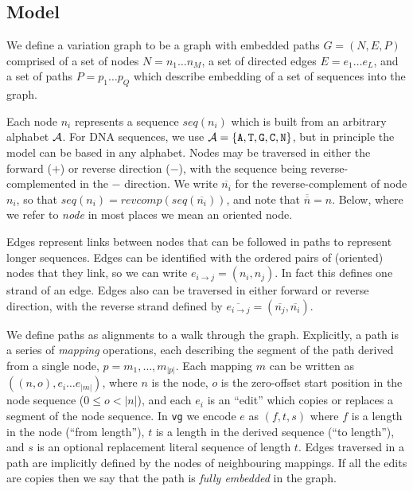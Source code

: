 \documentclass[12pt]{article}
\begin{document}
\subsection{Model}

We define a variation graph to be a graph with embedded paths $G = ( N, E, P )$ comprised of
a set of nodes $N = n_1 \ldots n_M$,
a set of directed edges $E = e_1 \ldots e_L$,
and a set of paths $P = p_1 \ldots p_Q$ which describe embedding of a set of sequences into the graph.

Each node $n_i$ represents a sequence $seq(n_i)$ which is built from an arbitrary alphabet ${ \cal A }$.
For DNA sequences, we use ${ \cal A } = \{ {\tt A, T, G, C, N} \}$, but in principle the model can be based in any alphabet.
Nodes may be traversed in either the forward ($+$) or reverse direction ($-$), with the sequence being reverse-complemented in the
$-$ direction.  
We write $\overline{n_i}$ for the reverse-complement of node $n_i$, so that $seq(n_i) = revcomp(seq(\overline{n_i}))$, and note
that $\overline{\overline{n}} = n$.  Below, where we refer to {\em node} in most places we mean an oriented node. 

Edges represent links between nodes that can be followed in paths to represent longer sequences.
Edges can be identified with the ordered pairs of (oriented) nodes that they link, so we can write
$e_{i \rightarrow j} = ( n_i, n_j ) $.  In fact this defines one strand of an edge.  Edges also can be traversed in either forward or
reverse direction, with the reverse strand defined by $\overline{e_{i \rightarrow j}} = (  \overline{n_j}, \overline{n_i} )$.

We define paths as alignments to a walk through the graph.  Explicitly, a path is a series of {\em mapping} operations, each
describing the segment of the path derived from a single node, $p = m_1, \ldots, m_{|p|}$.  Each mapping $m$ can be written
as $( (n, o), e_i \ldots e_{|m|} )$, where $n$ is the node, $o$ is the zero-offset start position in the node sequence ($0 \le o < |n|$),
and each $e_i$ is an ``edit'' which copies or replaces a segment of the node sequence.  In {\tt vg} we encode $e$ as $(f, t, s)$
where $f$ is a length in the node (``from length''), $t$ is a length in the derived sequence (``to length''), and $s$ is an optional
replacement literal sequence of length $t$.  Edges traversed in a path are implicitly defined by the nodes of neighbouring mappings.
If all the edits are copies then we say that the path is {\em fully embedded} in the graph.
\end{document}
